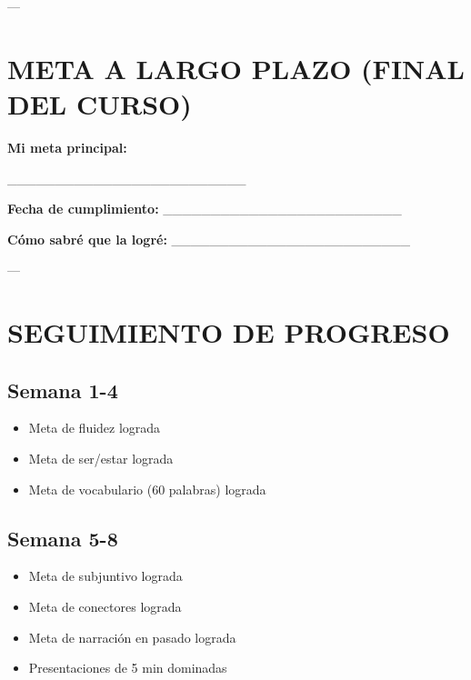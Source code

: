 \documentclass[a4paper,11pt]{article}
\begin{document}
---

\vspace{0.2cm}

\section{META A LARGO PLAZO (FINAL DEL CURSO)}

\vspace{0.2cm}

\textbf{Mi meta principal:}

_________________________

\textbf{Fecha de cumplimiento:} _________________________

\textbf{Cómo sabré que la logré:} _________________________

\vspace{0.2cm}

---

\vspace{0.2cm}

\section{SEGUIMIENTO DE PROGRESO}

\vspace{0.2cm}

\subsection{Semana 1-4}

\begin{itemize}

  \item [ ] Meta de fluidez lograda

  \item [ ] Meta de ser/estar lograda

  \item [ ] Meta de vocabulario (60 palabras) lograda

\end{itemize}

\vspace{0.2cm}

\subsection{Semana 5-8}

\begin{itemize}

  \item [ ] Meta de subjuntivo lograda

  \item [ ] Meta de conectores lograda

  \item [ ] Meta de narración en pasado lograda

  \item [ ] Presentaciones de 5 min dominadas

\end{itemize}
\end{document}
